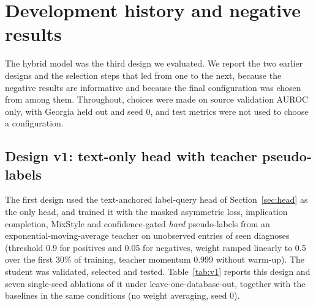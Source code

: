 \section{Development history and negative results}\label{secA2}
The hybrid model was the third design we evaluated. We report the two earlier designs and the selection steps that led from one to the next, because the negative results are informative and because the final configuration was chosen from among them. Throughout, choices were made on source validation AUROC only, with Georgia held out and seed 0, and test metrics were not used to choose a configuration.

\subsection{Design v1: text-only head with teacher pseudo-labels}\label{secA2:v1}
The first design used the text-anchored label-query head of Section~\ref{sec:head} as the only head, and trained it with the masked asymmetric loss, implication completion, MixStyle and confidence-gated \emph{hard} pseudo-labels from an exponential-moving-average teacher on unobserved entries of seen diagnoses (threshold 0.9 for positives and 0.05 for negatives, weight ramped linearly to 0.5 over the first 30\% of training, teacher momentum 0.999 without warm-up). The student was validated, selected and tested. Table~\ref{tab:v1} reports this design and seven single-seed ablations of it under leave-one-database-out, together with the baselines in the same conditions (no weight averaging, seed 0).

